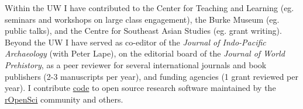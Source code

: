 \documentclass[11pt,article,oneside]{memoir}
\begin{document}
Within the UW I have contributed to the Center for Teaching and Learning (eg. seminars and workshops on large class engagement), the Burke Museum (eg. public talks), and the Centre for Southeast Asian Studies (eg. grant writing). Beyond the UW I have served as co-editor of the \textit{Journal of Indo-Pacific Archaeology} (with Peter Lape), on the editorial board of the \textit{Journal of World Prehistory}, as a peer reviewer for several international journals and book publishers (2-3 manuscripts per year), and funding agencies (1 grant reviewed per year). I contribute \href{https://github.com/benmarwick}{code} to open source research software maintained by the \href{http://ropensci.org}{rOpenSci} community and others.
\end{document}
